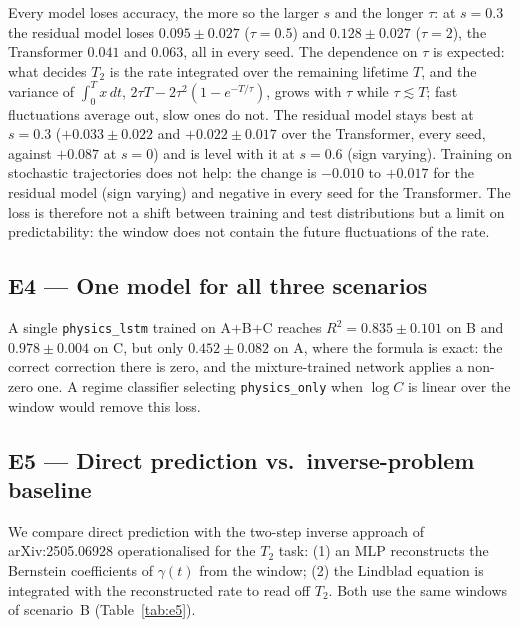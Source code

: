 \documentclass[twocolumn,10pt]{article}
\begin{document}
Every model loses accuracy, the more so the larger $s$ and the longer
$\tau$: at $s = 0.3$ the residual model loses $0.095 \pm 0.027$
($\tau = 0.5$) and $0.128 \pm 0.027$ ($\tau = 2$), the Transformer
$0.041$ and $0.063$, all in every seed. The dependence on $\tau$ is
expected: what decides $T_2$ is the rate integrated over the remaining
lifetime $T$, and the variance of $\int_0^T x\,dt$,
$2\tau T - 2\tau^2(1 - e^{-T/\tau})$, grows with $\tau$ while
$\tau \lesssim T$; fast fluctuations average out, slow ones do not.
The residual model stays best at $s = 0.3$ ($+0.033 \pm 0.022$ and
$+0.022 \pm 0.017$ over the Transformer, every seed, against $+0.087$ at
$s = 0$) and is level with it at $s = 0.6$ (sign varying).
Training on stochastic trajectories does not help: the change is
$-0.010$ to $+0.017$ for the residual model (sign varying) and negative
in every seed for the Transformer. The loss is therefore not a shift
between training and test distributions but a limit on predictability:
the window does not contain the future fluctuations of the rate.

\subsection{E4 --- One model for all three scenarios}
\label{sec:e4}

A single \texttt{physics\_lstm} trained on A+B+C reaches
$R^2 = 0.835 \pm 0.101$ on B and $0.978 \pm 0.004$ on C, but only
$0.452 \pm 0.082$ on A, where the formula is exact: the correct correction there is zero, and the
mixture-trained network applies a non-zero one. A regime classifier
selecting \texttt{physics\_only} when $\log C$ is linear over the window
would remove this loss.

\subsection{E5 --- Direct prediction vs.\ inverse-problem baseline}
\label{sec:e5}

We compare direct prediction with the two-step inverse approach of
arXiv:2505.06928 operationalised for the $T_2$ task: (1) an MLP
reconstructs the Bernstein coefficients of $\gamma(t)$ from the window;
(2) the Lindblad equation is integrated with the reconstructed rate to
read off $T_2$. Both use the same windows of scenario~B
(Table~\ref{tab:e5}).
\end{document}
